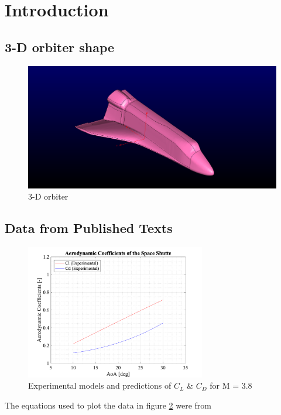 \section{Introduction}

\subsection{3-D orbiter shape}
\begin{figure}[H]
 \centering
 \includegraphics[width=\textwidth]{report_images/ss_image.png}
 \caption{3-D orbiter}
 \label{fig: ss_image}
\end{figure}

\subsection{Data from Published Texts}

\begin{figure}[ht!]
 \centering
 \includegraphics[width=0.7\textwidth]{matlab_images/aero_coeff_exp.png}
 \caption{Experimental models and predictions of $C_L$ \& $C_D$ for M = 3.8}
 \label{fig: coeff_exp}
\end{figure}

The equations used to plot the data in figure \ref{fig: coeff_exp} were from \cite{ss_prediction}

